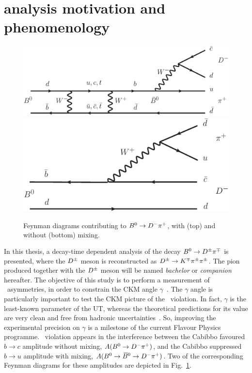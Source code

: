 
\section[$\Bz\to\Dpm\pimp$ analysis motivation and phenomenology]{\boldmath{$\Bz\to\Dpm\pimp$} analysis motivation and phenomenology}
\label{sec:intro}
\setlength{\textfloatsep}{30pt}
\begin{figure}[t]
        \begin{center}
                \includegraphics[width=0.8\linewidth]{01Introduction/figs/Mixed.eps}
                \includegraphics[width=0.7\linewidth]{01Introduction/figs/Unmixed.eps}
        \end{center}
        \vspace{-2mm}
        \caption{Feynman diagrams contributing to $B^0\rightarrow D^-\pi^+$, with (top) and without (bottom) mixing.}
        \label{fig:Feynman}
        \afterpage{\global\setlength{\textfloatsep}{\oldtextfloatsep}}
\end{figure}
In this thesis, a decay-time dependent analysis of the decay $\Bz\to
\Dpm\pimp$ is presented, where the $D^\pm$ meson is reconstructed as $D^\pm\rightarrow K^\mp\pi^\pm\pi^\pm$. The 
pion produced together with the $D^\pm$ meson will be named \emph{bachelor} or \emph{companion} hereafter.
The objective of this study is to perform a
measurement of \CP~asymmetries, in order to constrain the CKM angle
$\gamma$~\cite{PRL-10-1963-531,PTP-49-1973-652}. The $\gamma$ angle is particularly important to test 
the CKM picture of the \CP~violation. In fact, $\gamma$ is the least-known parameter of the UT, whereas 
the theoretical predictions for its value are very clean and free from hadronic uncertainties~\cite{Fleischer:2003yb,Aleksan:1991nh,Dunietz:1987bvsss}. 
So, improving the experimental precision on $\gamma$ is a milestone of the current Flavour Physics programme.
\CP~violation appears in the interference between the Cabibbo favoured $b\to c$
amplitude without mixing, $A(B^0\rightarrow D^-\pi^+)$, and the Cabibbo suppressed $b\to u$
amplitude with mixing, $A(B^0\rightarrow\kern 0.18em\overline{\kern -0.18em B}{}^0\rightarrow D^-\pi^+)$. Two of the corresponding
Feynman diagrams for these amplitudes are depicted in Fig.~\ref{fig:Feynman}.

